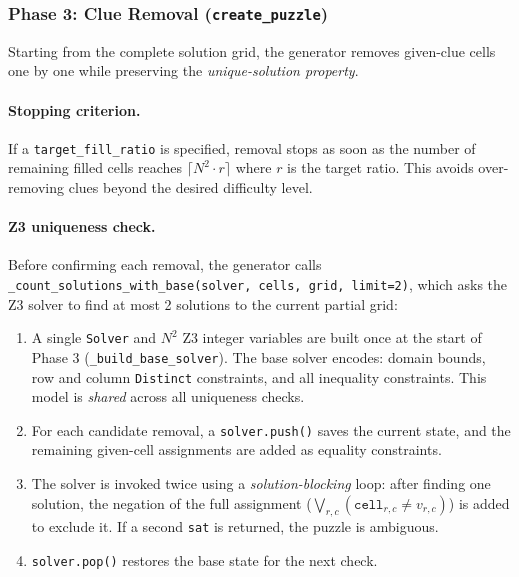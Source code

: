 \subsubsection{Phase 3: Clue Removal (\texttt{create\_puzzle})}

Starting from the complete solution grid, the generator removes given-clue
cells one by one while preserving the \emph{unique-solution property}.

\paragraph{Stopping criterion.}
If a \texttt{target\_fill\_ratio} is specified, removal stops as soon as the
number of remaining filled cells reaches $\lceil N^2 \cdot r \rceil$ where
$r$ is the target ratio.
This avoids over-removing clues beyond the desired difficulty level.

\paragraph{Z3 uniqueness check.}
Before confirming each removal, the generator calls
\texttt{\_count\_solutions\_with\_base(solver, cells, grid, limit=2)}, which
asks the Z3 solver to find at most 2 solutions to the current partial grid:

\begin{enumerate}
  \item A single \texttt{Solver} and $N^2$ Z3 integer variables are built
        once at the start of Phase 3 (\texttt{\_build\_base\_solver}).
        The base solver encodes: domain bounds, row and column \texttt{Distinct}
        constraints, and all inequality constraints.
        This model is \emph{shared} across all uniqueness checks.

  \item For each candidate removal, a \texttt{solver.push()} saves the
        current state, and the remaining given-cell assignments are added as
        equality constraints.

  \item The solver is invoked twice using a \emph{solution-blocking} loop:
        after finding one solution, the negation of the full assignment
        ($\bigvee_{r,c} (\texttt{cell}_{r,c} \ne v_{r,c})$) is added to
        exclude it.
        If a second \texttt{sat} is returned, the puzzle is ambiguous.

  \item \texttt{solver.pop()} restores the base state for the next check.
\end{enumerate}

